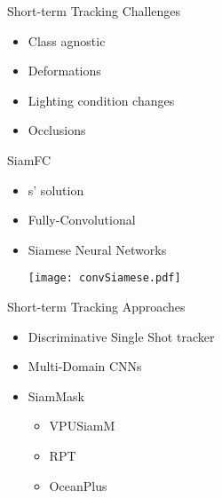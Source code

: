\documentclass[mathserif, 14pt, xcolor=svgnames]{beamer}
\renewcommand {\cite} {\citep}  %
\begin{document}
\bgroup

\begin{frame}{Short-term Tracking Challenges}
    \begin{itemize}
      \setlength\itemsep{1.5em}
       \item \hspace{0pt}
         \pause Class agnostic
       \item \hspace{0pt}
         \pause Deformations
       \item \hspace{0pt}
         \pause Lighting condition changes
       \item \hspace{0pt}
          \pause Occlusions
    \end{itemize}
\end{frame}
\egroup

\bgroup
\begin{frame}{SiamFC}
   \begin{itemize}
     \setlength\itemsep{1.2em}
     \item \hspace{0pt}
       \pause \citet{bertinetto2016}s' solution
     \item \hspace{0pt}
       \pause Fully-Convolutional 
     \item \hspace{0pt}
       \pause Siamese Neural Networks
      \begin{center}
        \texttt{[image: convSiamese.pdf]}
      \end{center}
    \end{itemize}
\end{frame}
\egroup

\bgroup
\begin{frame}{Short-term Tracking Approaches}

    \begin{itemize}
      \setlength\itemsep{1.2em}
       \item \hspace{0pt}
         Discriminative Single Shot tracker \citep{lukezic2020} 
         \begin{center}
         \end{center}
       \item \hspace{0pt}
          Multi-Domain CNNs \citep{Nam2016}
       \item \hspace{0pt}
         SiamMask \citep{wang2019}
          \begin{itemize}
            \item VPUSiamM \cite{VOT2020}
            \item RPT
            \item OceanPlus
          \end{itemize}
    \end{itemize}
\end{frame}
\egroup
\end{document}
